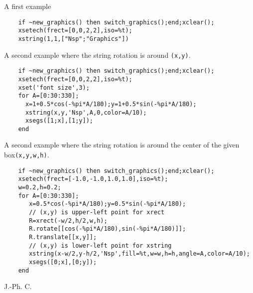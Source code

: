 \begin{examples}

\noindent A first example

  \begin{Verbatim}
    if ~new_graphics() then switch_graphics();end;xclear();
    xsetech(frect=[0,0,2,2],iso=%t);
    xstring(1,1,["Nsp";"Graphics"])
  \end{Verbatim}

\noindent A second example where the string rotation is around \verb!(x,y)!.

  \begin{Verbatim}
    if ~new_graphics() then switch_graphics();end;xclear();
    xsetech(frect=[0,0,2,2],iso=%t);
    xset('font size',3);
    for A=[0:30:330];
      x=1+0.5*cos(-%pi*A/180);y=1+0.5*sin(-%pi*A/180);
      xstring(x,y,'Nsp',A,0,color=A/10);
      xsegs([1;x],[1;y]);
    end
  \end{Verbatim}

\noindent A second example where the string rotation is around the center of the
  given box\verb!(x,y,w,h)!.

  \begin{Verbatim}
    if ~new_graphics() then switch_graphics();end;xclear();
    xsetech(frect=[-1.0,-1.0,1.0,1.0],iso=%t);
    w=0.2,h=0.2;
    for A=[0:30:330];
       x=0.5*cos(-%pi*A/180);y=0.5*sin(-%pi*A/180);
       // (x,y) is upper-left point for xrect
       R=xrect(-w/2,h/2,w,h);
       R.rotate[[cos(-%pi*A/180),sin(-%pi*A/180)]];
       R.translate[[x,y]];
       // (x,y) is lower-left point for xstring
       xstring(x-w/2,y-h/2,'Nsp',fill=%t,w=w,h=h,angle=A,color=A/10);
       xsegs([0;x],[0;y]);
    end
  \end{Verbatim}

\end{examples}

\begin{manseealso}
     
\end{manseealso}


\begin{authors}
  J.-Ph. C.
\end{authors}
